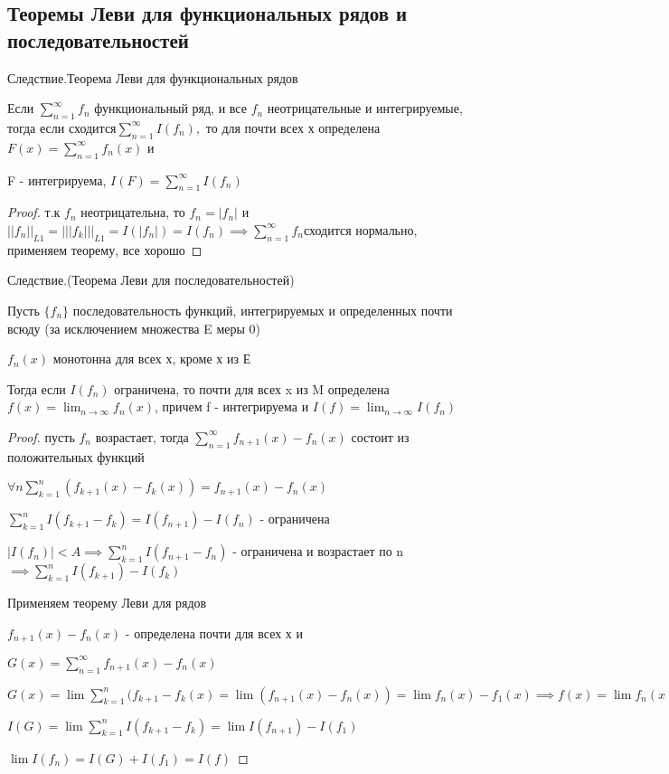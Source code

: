 \documentclass[a4paper]{article}
\theoremstyle{definition}
\theoremstyle{remark}
\begin{document}
    \subsection{ Теоремы Леви для функциональных рядов и последовательностей}
    Следствие.{Теорема Леви для функциональных рядов}

Если $\sum_{n = 1}^{\infty} f_n$ функциональный ряд, и все $f_n$ неотрицательные и интегрируемые, тогда если 
сходится$\sum_{n = 1}^{\infty} I(f_n),$ то для почти всех х определена $F(x) = \sum_{n = 1}^{\infty} f_n(x)$ и

F -  интегрируема, $I(F) = \sum_{n = 1}^{\infty} I(f_n)$

\begin{proof}
     т.к $f_n$ неотрицательна, то $f_n  = |f_n|$ и $||f_n||_{L1} = |||f_k|||_{L1} = I(|f_n|) = I(f_n) \implies \sum_{n = 1}^{\infty} f_n $сходится нормально, применяем 
     теорему, все хорошо 
\end{proof}
Следствие.(Теорема Леви для последовательностей)

Пусть $\{f_n\}$ последовательность функций, интегрируемых и определенных почти всюду (за исключением множества E меры 0)

$f_n(x)$ монотонна для всех х, кроме х из Е

Тогда если $I(f_n)$ ограничена, то почти для всех x из M определена $f(x) = \lim_{n\to\infty}f_n(x)$, причем
f - интегрируема и $I(f) = \lim_{n\to\infty} I(f_n)$
\begin{proof}
     пусть $f_n$ возрастает, тогда $\sum_{n = 1}^{\infty} f_{n+1}(x)-f_n(x)$ состоит из положительных функций 

     $\forall n \sum_{k = 1}^{n} (f_{k+1}(x) - f_k(x)) = f_{n+1}(x) - f_n(x)$

     $\sum_{k = 1}^{n}I(f_{k+1} - f_k) = I(f_{n+1}) - I(f_n)$ - ограничена 
     
     $|I(f_n)|< A \implies \sum_{k = 1}^{n} I(f_{n+1} - f_n)$ - ограничена и возрастает по n $\implies \sum_{k = 1}^{n} I(f_{k+1}) - I(f_k)  $

     Применяем теорему Леви для рядов

     $f_{n+1}(x) - f_n(x)$ - определена почти для всех х и

    $ G(x) = \sum_{n = 1}^{\infty}  f_{n+1}(x) - f_n(x)$

    $ G(x) = \lim \sum_{k = 1}^{n} (f_{k+1} - f_k(x) = \lim (f_{n+1}(x) - f_n(x)) = \lim f_n(x) - f_1(x)\implies f(x) = \lim f_n(x) = G(x) + f_1(x)$
     
     $I(G) = \lim\sum_{k = 1}^{n} I(f_{k+1} - f_k) = \lim I(f_{n+1}) - I(f_1)$
     
     $\lim I(f_n) = I(G) + I(f_1) = I(f)$
\end{proof}
\end{document}
